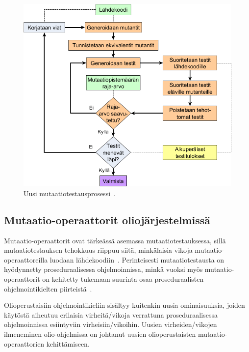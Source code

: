\documentclass[finnish, grading]{tktltiki2}
\theoremstyle{definition}
\theoremstyle{remark}
\begin{document}
\begin{figure}[H]
	\centering
		\includegraphics[width=\textwidth]{uusiprosessi}
	\caption{Uusi mutaatiotestausprosessi~\cite[s. 41]{Offutt:Untch:2001}.}
	\label{figure:UusiMutaatiotestausprosessi}
\end{figure}


\subsection{Mutaatio-operaattorit oliojärjestelmissä}



Mutaatio-operaattorit ovat tärkeässä asemassa mutaatiotestauksessa, sillä mutaatiotestauksen tehokkuus riippuu siitä, minkälaisia vikoja mutaatio-operaattoreilla luodaan lähdekoodiin~\cite[s. 352]{Ma:Kwon:Offutt:2002}. Perinteisesti mutaatiotestausta on hyödynnetty proseduraalisessa ohjelmoinnissa, minkä vuoksi myös mutaatio-operaattorit on kehitetty tukemaan suurinta osaa proseduraalisten ohjelmointikielten piirteistä~\cite[s. 352]{Ma:Kwon:Offutt:2002}. 

Olioperustaisiin ohjelmointikieliin sisältyy kuitenkin uusia ominaisuuksia, joiden käytöstä aiheutuu erilaisia virheitä/vikoja verrattuna proseduraalisessa ohjelmoinnissa esiintyviin virheisiin/vikoihin. Uusien virheiden/vikojen ilmeneminen olio-ohjelmissa on johtanut uusien olioperustaisten mutaatio-operaattorien kehittämiseen.  
\end{document}
